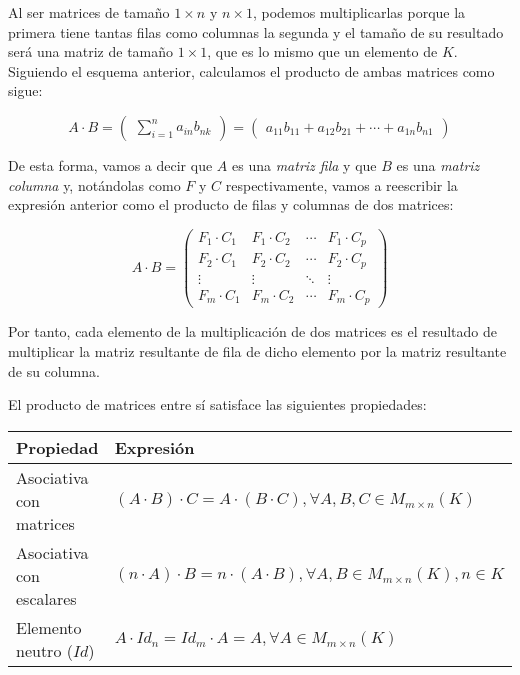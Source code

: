 Al ser matrices de tamaño $1 \times n$ y $n \times 1$, podemos multiplicarlas porque la primera tiene tantas filas como columnas la segunda y el tamaño de su resultado será una matriz de tamaño $1 \times 1$, que es lo mismo que un elemento de $K$.
Siguiendo el esquema anterior, calculamos el producto de ambas matrices como sigue:

\[
	A \cdot B =
	\begin{pmatrix}
		\sum_{i=1}^{n} a_{in}b_{nk}
	\end{pmatrix}
	=
	\begin{pmatrix}
		a_{11}b_{11}+a_{12}b_{21}+\cdots+a_{1n}b_{n1}
	\end{pmatrix}
\]

De esta forma, vamos a decir que $A$ es una \textit{matriz fila} y que $B$ es una \textit{matriz columna} y, notándolas como $F$ y $C$ respectivamente, vamos a reescribir la expresión anterior como el producto de filas y columnas de dos matrices:

\[
	A \cdot B =
	\begin{pmatrix}
		F_1 \cdot C_1 & F_1 \cdot C_2 & \cdots & F_1 \cdot C_p \\
		F_2 \cdot C_1 & F_2 \cdot C_2 & \cdots & F_2 \cdot C_p \\
		\vdots        & \vdots        & \ddots & \vdots        \\
		F_m \cdot C_1 & F_m \cdot C_2 & \cdots & F_m \cdot C_p
	\end{pmatrix}
\]

Por tanto, cada elemento de la multiplicación de dos matrices es el resultado de multiplicar la matriz resultante de fila de dicho elemento por la matriz resultante de su columna.

El producto de matrices entre sí satisface las siguientes propiedades:

\begin{center}
\begin{tabular}{l l}
	\textbf{Propiedad}       & \textbf{Expresión}                                                                          \\
	\toprule
	Asociativa con matrices  & $(A \cdot B)  \cdot  C = A  \cdot  (B \cdot C), \forall A,B,C \in M_{m \times n}(K)$        \\
	Asociativa con escalares & $(n \cdot A)  \cdot  B = n  \cdot  (A \cdot B), \forall A,B \in M_{m \times n}(K), n \in K$ \\
	Elemento neutro ($Id$)   & $A \cdot Id_n = Id_m \cdot A = A, \forall A \in M_{m \times n}(K)$                          \\
\end{tabular}
\end{center}

